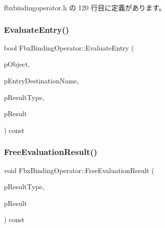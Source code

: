  fbxbindingoperator.\+h の 120 行目に定義があります。

\mbox{\label{class_fbx_binding_operator_a00fe9d445d7ffd44b4da764af49e0d9d}} 
\subsubsection{\texorpdfstring{Evaluate\+Entry()}{EvaluateEntry()}\hspace{0.1cm}{\footnotesize\ttfamily [2/2]}}
{\footnotesize\ttfamily bool Fbx\+Binding\+Operator\+::\+Evaluate\+Entry (\begin{DoxyParamCaption}\item[{const \hyperlink{class_fbx_object}{Fbx\+Object} $\ast$}]{p\+Object,  }\item[{const char $\ast$}]{p\+Entry\+Destination\+Name,  }\item[{\hyperlink{fbxpropertytypes_8h_a73913a5ddfb20e57c6f25e9e6784bd92}{E\+Fbx\+Type} $\ast$}]{p\+Result\+Type,  }\item[{void $\ast$$\ast$}]{p\+Result }\end{DoxyParamCaption}) const}

\mbox{\label{class_fbx_binding_operator_af7e8559f61c34efa27b1562d386efd2c}} 
\subsubsection{\texorpdfstring{Free\+Evaluation\+Result()}{FreeEvaluationResult()}}
{\footnotesize\ttfamily void Fbx\+Binding\+Operator\+::\+Free\+Evaluation\+Result (\begin{DoxyParamCaption}\item[{\hyperlink{fbxpropertytypes_8h_a73913a5ddfb20e57c6f25e9e6784bd92}{E\+Fbx\+Type}}]{p\+Result\+Type,  }\item[{void $\ast$}]{p\+Result }\end{DoxyParamCaption}) const\hspace{0.3cm}{\ttfamily [protected]}}

